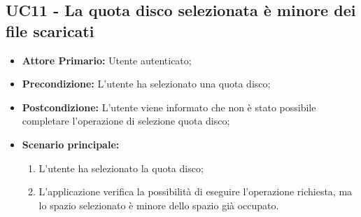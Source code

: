 \subsection{UC11 - La quota disco selezionata è minore dei file scaricati}
\label{UC11}
\begin{itemize}
\item \textbf{Attore Primario:} Utente autenticato;
\item \textbf{Precondizione:} L'utente ha selezionato una quota disco;
\item \textbf{Postcondizione:} L'utente viene informato che non è stato possibile completare l'operazione di selezione quota disco;
\item \textbf{Scenario principale:}
    \begin{enumerate}
    \item L'utente ha selezionato la quota disco;
    \item L'applicazione verifica la possibilità di eseguire l'operazione richiesta, ma lo spazio selezionato è minore dello spazio già occupato.
    \end{enumerate}
\end{itemize}